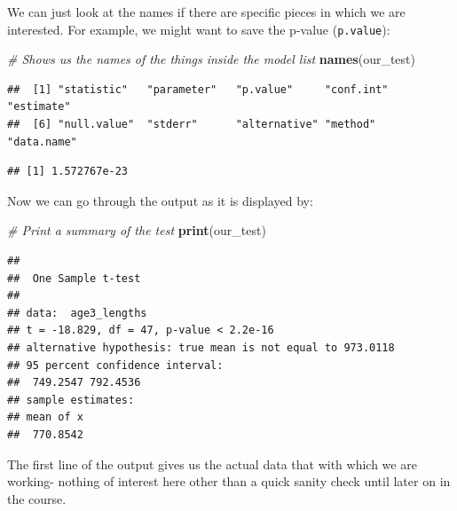 \documentclass[
]{book}
\newenvironment{Shaded}{\begin{snugshade}}{\end{snugshade}}
\newcommand{\CommentTok}[1]{\textcolor[rgb]{0.56,0.35,0.01}{\textit{#1}}}
\newcommand{\KeywordTok}[1]{\textcolor[rgb]{0.13,0.29,0.53}{\textbf{#1}}}
\newcommand{\NormalTok}[1]{#1}
\newcommand{\OperatorTok}[1]{\textcolor[rgb]{0.81,0.36,0.00}{\textbf{#1}}}
\newcommand{\StringTok}[1]{\textcolor[rgb]{0.31,0.60,0.02}{#1}}
\begin{document}
We can just look at the names if there are specific pieces in which we are interested. For example, we might want to save the p-value (\texttt{p.value}):

\begin{Shaded}
\begin{Highlighting}[]
\CommentTok{# Shows us the names of the things inside the model list}
  \KeywordTok{names}\NormalTok{(our_test) }
\end{Highlighting}
\end{Shaded}

\begin{verbatim}
##  [1] "statistic"   "parameter"   "p.value"     "conf.int"    "estimate"   
##  [6] "null.value"  "stderr"      "alternative" "method"      "data.name"
\end{verbatim}

\begin{Shaded}
\end{Shaded}

\begin{verbatim}
## [1] 1.572767e-23
\end{verbatim}

Now we can go through the output as it is displayed by:

\begin{Shaded}
\begin{Highlighting}[]
\CommentTok{# Print a summary of the test}
  \KeywordTok{print}\NormalTok{(our_test)}
\end{Highlighting}
\end{Shaded}

\begin{verbatim}
## 
## 	One Sample t-test
## 
## data:  age3_lengths
## t = -18.829, df = 47, p-value < 2.2e-16
## alternative hypothesis: true mean is not equal to 973.0118
## 95 percent confidence interval:
##  749.2547 792.4536
## sample estimates:
## mean of x 
##  770.8542
\end{verbatim}

The first line of the output gives us the actual data that with which we are working- nothing of interest here other than a quick sanity check until later on in the course.
\end{document}
